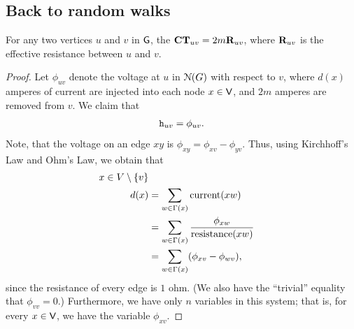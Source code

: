 \subsection{Back to random walks}


\begin{theorem}
    For any two vertices $u$ and $v$ in $\mathsf{G}$, the 
    $\mathbf{CT}_{uv} = 2 m \mathbf{R}_{uv}$, where
    $\mathbf{R}_{uv}$ is the effective resistance between $u$ and
    $v$.
\end{theorem}

\begin{proof}
    Let $\phi_{uv}$ denote the voltage at $u$ in $\EuScript{N}(G)$ with
    respect to $v$, where $d(x)$ amperes of current are injected into
    each node $x \in \mathsf{V}$, and $2m$ amperes are removed from
    $v$. We claim that
    \begin{align*}
        \mathtt{h}_{uv} = \phi_{uv}.
    \end{align*}
    Note, that the voltage on an edge $x y$ is $\phi_{xy} = \phi_{xv}
    - \phi_{yv}$. Thus, using Kirchhoff's Law and Ohm's Law, we obtain
    that
    \begin{align}
        x \in V \setminus \brc{v} \nonumber\\
        d(x) &= \sum_{w \in
           \Nbr(x)} \mathrm{current}(x w) \nonumber\\
        &= \sum_{w \in \Nbr(x)}
        \frac{\phi_{x w}}{\mathrm{resistance}(x w)} \nonumber\\
        &= \sum_{w \in
           \Nbr(x)} \pth{ \phi_{x v} - \phi_{wv}},%
        \eqlab{voltage}
    \end{align}
    since the resistance of every edge is $1$ ohm. (We also have the
    ``trivial'' equality that $\phi_{vv}=0$.)  Furthermore, we have
    only $n$ variables in this system; that is, for every $x \in
    \mathsf{V}$, we have the variable $\phi_{x v}$.
    

\end{proof}
